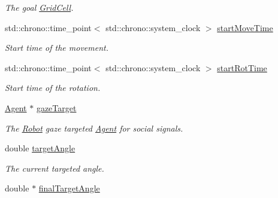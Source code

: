 \begin{DoxyCompactItemize}
\begin{DoxyCompactList}\small\item\em The goal \hyperlink{classGridCell}{Grid\+Cell}. \end{DoxyCompactList}\item 
std\+::chrono\+::time\+\_\+point$<$ std\+::chrono\+::system\+\_\+clock $>$ \hyperlink{classRobot_a4d1fbc7e28a1e3d07bbdfdcc8612a3bf}{start\+Move\+Time}\hypertarget{classRobot_a4d1fbc7e28a1e3d07bbdfdcc8612a3bf}{}\label{classRobot_a4d1fbc7e28a1e3d07bbdfdcc8612a3bf}

\begin{DoxyCompactList}\small\item\em Start time of the movement. \end{DoxyCompactList}\item 
std\+::chrono\+::time\+\_\+point$<$ std\+::chrono\+::system\+\_\+clock $>$ \hyperlink{classRobot_a2eba6b986b51c8197d77bc8c8169fb99}{start\+Rot\+Time}\hypertarget{classRobot_a2eba6b986b51c8197d77bc8c8169fb99}{}\label{classRobot_a2eba6b986b51c8197d77bc8c8169fb99}

\begin{DoxyCompactList}\small\item\em Start time of the rotation. \end{DoxyCompactList}\item 
\hyperlink{classAgent}{Agent} $\ast$ \hyperlink{classRobot_a16adeabd42cf91daf19f7737d7f6c1f3}{gaze\+Target}\hypertarget{classRobot_a16adeabd42cf91daf19f7737d7f6c1f3}{}\label{classRobot_a16adeabd42cf91daf19f7737d7f6c1f3}

\begin{DoxyCompactList}\small\item\em The \hyperlink{classRobot}{Robot} gaze targeted \hyperlink{classAgent}{Agent} for social signals. \end{DoxyCompactList}\item 
double \hyperlink{classRobot_a0d83147dd6fa4db281ed2d6f3c37adf7}{target\+Angle}\hypertarget{classRobot_a0d83147dd6fa4db281ed2d6f3c37adf7}{}\label{classRobot_a0d83147dd6fa4db281ed2d6f3c37adf7}

\begin{DoxyCompactList}\small\item\em The current targeted angle. \end{DoxyCompactList}\item 
double $\ast$ \hyperlink{classRobot_af3df5c8b9901dc8bc721cb0a4fdbc489}{final\+Target\+Angle}\hypertarget{classRobot_af3df5c8b9901dc8bc721cb0a4fdbc489}{}\label{classRobot_af3df5c8b9901dc8bc721cb0a4fdbc489}


\end{DoxyCompactItemize}
